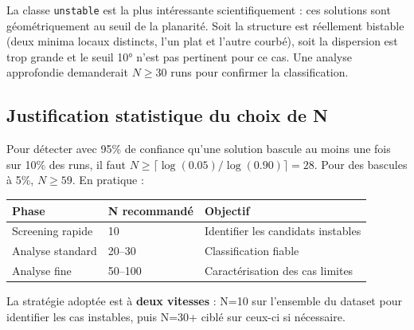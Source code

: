 \begin{remarque}
  La classe \texttt{unstable} est la plus intéressante scientifiquement : ces solutions sont
  géométriquement au seuil de la planarité. Soit la structure est réellement bistable (deux
  minima locaux distincts, l'un plat et l'autre courbé), soit la dispersion est trop grande
  et le seuil 10° n'est pas pertinent pour ce cas. Une analyse approfondie demanderait
  $N \geq 30$ runs pour confirmer la classification.
\end{remarque}

\subsection{Justification statistique du choix de N}

Pour détecter avec 95\% de confiance qu'une solution bascule au moins une fois sur 10\% des
runs, il faut $N \geq \lceil \log(0.05) / \log(0.90) \rceil = 28$. Pour des bascules à 5\%,
$N \geq 59$. En pratique :

\begin{center}
\begin{tabular}{lll}
  \toprule
  Phase & N recommandé & Objectif \\
  \midrule
  Screening rapide  & 10      & Identifier les candidats instables \\
  Analyse standard  & 20--30  & Classification fiable \\
  Analyse fine      & 50--100 & Caractérisation des cas limites \\
  \bottomrule
\end{tabular}
\end{center}

La stratégie adoptée est à \textbf{deux vitesses} : N=10 sur l'ensemble du dataset pour
identifier les cas instables, puis N=30+ ciblé sur ceux-ci si nécessaire.
